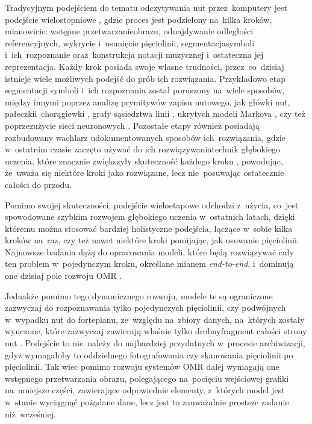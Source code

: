 \documentclass[xodstep]{wnspt}
\begin{document}
Tradycyjnym podejściem do tematu odczytywania nut przez~komputery jest podejście wielostopniowe \cite{Rebelo2012}, gdzie proces jest podzielony na~kilka kroków, mianowicie: wstępne przetwarzanie\linebreak obrazu, odnajdywanie odległości referencyjnych, wykrycie i~usunięcie pięciolinii, segmentacja\linebreak symboli i~ich~rozpoznanie oraz~konstrukcja notacji muzycznej i~ostateczna jej reprezentacja. Każdy krok posiada swoje własne trudności, przez~co~dzisiaj istnieje wiele możliwych podejść do prób ich rozwiązania. Przykładowo etap segmentacji symboli i~ich rozpoznania został poruszony na~wiele sposobów, między innymi poprzez analizę prymitywów zapisu nutowego, jak główki nut, pałeczki\linebreak i~chorągiewki \cite{Toyama2006}, grafy sąsiedztwa linii \cite{Reed1996}, ukrytych modeli Markova \cite{Pugin2006}, czy też poprzez\linebreak użycie sieci neuronowych \cite{Mehta2015}. Pozostałe etapy również posiadają rozbudowany wachlarz udokumentowanych sposobów ich~rozwiązania, gdzie w~ostatnim czasie zaczęto używać do ich rozwiązywania\linebreak technik głębokiego uczenia, które znacznie zwiększyły skuteczność każdego kroku \cite{Pacha2017}\cite{Gallego2017}, powodując, że~uważa się niektóre kroki jako rozwiązane, lecz nie~posuwając ostatecznie całości do przodu.

Pomimo swojej skuteczności, podejście wieloetapowe odchodzi z~użycia, co~jest spowodowane szybkim rozwojem głębokiego uczenia w~ostatnich latach, dzięki któremu można stosować bardziej holistyczne podejścia, łączące w~sobie kilka kroków na~raz, czy też nawet niektóre kroki pomijając, jak usuwanie pięciolinii. Najnowsze badania dążą do opracowania modeli, które będą rozwiązywać cały ten problem w~pojedynczym kroku, określane mianem \textit{end-to-end}, i~dominują one dzisiaj pole rozwoju OMR \cite{Calvo-Zaragoza2018}\cite{Rios-Vila2023}. 

Jednakże pomimo tego dynamicznego rozwoju, modele te są ograniczone zazwyczaj do rozpoznawania tylko pojedynczych pięciolinii, czy podwójnych w~wypadku nut do fortepianu, ze~względu na~zbiory danych, na~których zostały wyuczone, które zazwyczaj zawierają właśnie tylko drobny\linebreak fragment całości strony nut \cite{Calvo-Zaragoza2018b}\cite{Shatri2021}. Podejście to nie~należy do najbardziej przydatnych w~procesie archiwizacji, gdyż wymagałoby to oddzielnego fotografowania czy skanowania pięciolinii po pięciolinii. Tak wiec pomimo rozwoju systemów OMR dalej wymagają one wstępnego przetwarzania obrazu, polegającego na~pocięciu wejściowej grafiki na~mniejsze części, zawierające odpowiednie elementy, z~których model jest w~stanie wyciągnąć pożądane dane, lecz jest to zauważalnie prostsze zadanie niż~wcześniej. 
\end{document}
